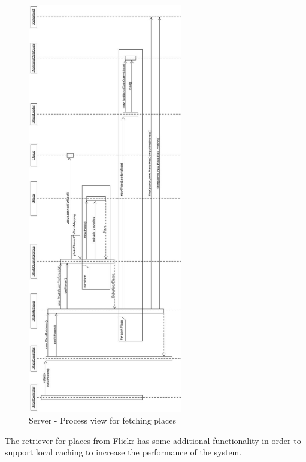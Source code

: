 \documentclass[11pt]{book}
\begin{document}
\begin{figure}[H]
      \centering
      \includegraphics[width=0.6\textwidth]{Figures/Architecture/Sequence/place.jpg}
      \caption{Server - Process view for fetching places}
      \label{fig:arch_server_process_place}
\end{figure}

The retriever for places from Flickr has some additional functionality in order to support local caching to increase the performance of the system.
\end{document}
